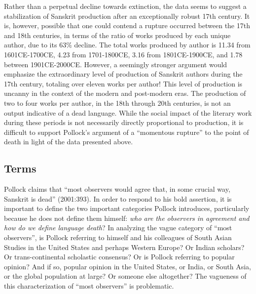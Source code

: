 Rather than a perpetual decline towards extinction, the data seems to suggest a stabilization of Sanskrit production after an exceptionally robust 17th century. It is, however, possible that one could contend a rupture occurred between the 17th and 18th centuries, in terms of the ratio of works produced by each unique author, due to its 63\% decline. The total works produced by author is 11.34 from 1601CE-1700CE, 4.23 from 1701-1800CE, 3.16 from 1801CE-1900CE, and 1.78 between 1901CE-2000CE\@. However, a seemingly stronger argument would emphasize the extraordinary level of production of Sanskrit authors during the 17th century, totaling over eleven works per author! This level of production is uncanny in the context of the modern and post-modern eras. The production of two to four works per author, in the 18th through 20th centuries, is not an output indicative of a dead language. While the social impact of the literary work during these periods is not necessarily directly proportional to production, it is difficult to support Pollock’s argument of a “momentous rupture” to the point of death in light of the data presented above. 

\subsection*{Terms}

Pollock claims that “most observers would agree that, in some crucial way, Sanskrit is dead” (2001:393). In order to respond to his bold assertion, it is important to define the two important categories Pollock introduces, particularly because he does not define them himself: {\sl who are the observers in agreement and how do we define language death}? In analyzing the vague category of “most observers”, is Pollock referring to himself and his colleagues of South Asian Studies in the United States and perhaps Western Europe? Or Indian scholars? Or trans-continental scholastic consensus? Or is Pollock referring to popular opinion? And if so, popular opinion in the United States, or India, or South Asia, or the global population at large? Or someone else altogether? The vagueness of this characterization of “most observers” is problematic. 

